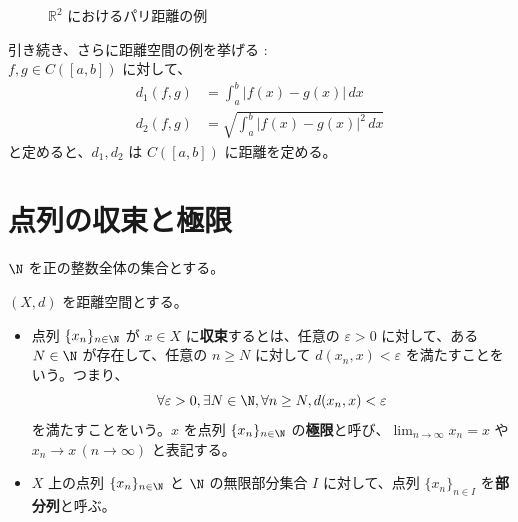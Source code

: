 \documentclass[article,paper=a4paper]{jlreq}
\begin{document}
\begin{figure}[htbp]
\begin{minipage}[t]{0.47\textwidth}
\end{minipage}

\vspace{1\baselineskip}
\caption{$\mathbb{R}^2$ におけるパリ距離の例}
\label{fig:d2p-minipage}
\end{figure}

\begin{ex}
    引き続き、さらに距離空間の例を挙げる :\\
    $f, g \in C([a,b])$ に対して、
    \begin{align*}
        d_{1}(f,g) &= \int_a^b \left\lvert f(x) - g(x) \right\rvert \,dx \\
        d_{2}(f,g) &= \sqrt{\int_a^b \left\lvert f(x) - g(x) \right\rvert^2 \,dx}
    \end{align*}
    と定めると、$d_{1}, d_{2}$ は $C([a,b])$ に距離を定める。
\end{ex}

\section{点列の収束と極限}

$\N$ を正の整数全体の集合とする。

\begin{dfn}
    $(X,d)$ を距離空間とする。
    \begin{itemize}
        \item 点列 $\{x_n\}_{n \in \N}$ が $x \in X$ に\textbf{収束}するとは、任意の $\varepsilon > 0$ に対して、ある $N \in \N$ が存在して、任意の $n \geq N$ に対して $d(x_n,x) < \varepsilon$ を満たすことをいう。つまり、
        \[\forall \varepsilon > 0, \exists N \in \N, \forall n \geq N, d(x_n,x) < \varepsilon\]
        を満たすことをいう。$x$ を点列 $\{x_n\}_{n \in \N}$ の\textbf{極限}と呼び、$\lim_{n \to \infty} x_n = x$ や $x_n \to x \, (n \to \infty)$ と表記する。
        \item $X$ 上の点列 $\{x_n\}_{n\in \N}$ と $\N$ の無限部分集合 $I$ に対して、点列 $\{x_n\}_{n \in I}$ を\textbf{部分列}と呼ぶ。
    \end{itemize}
\end{dfn}
\end{document}
